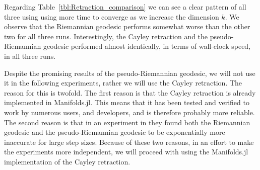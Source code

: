 Regarding Table~\ref{tbl:Retraction_comparison} we can see a clear pattern of all three using using more time to converge as we increase the dimension $k$. We observe that the Riemannian geodesic performs somewhat worse than the other two for all three runs. Interestingly, the Cayley retraction and the pseudo-Riemannian geodesic performed almost identically, in terms of wall-clock speed, in all three runs. 

Despite the promising results of the pseudo-Riemannian geodesic, we will not use it in the following experiments, rather we will use the Cayley retraction. The reason for this is twofold. The first reason is that the Cayley retraction is already implemented in Manifolds.jl. This means that it has been tested and verified to work by numerous users, and developers, and is therefore probably more reliable. The second reason is that in an experiment in \cite[p.~26]{BendokatZimmermann2021} they found both the Riemannian geodesic and the pseudo-Riemannian geodesic to be exponentially more inaccurate for large step sizes. Because of these two reasons, in an effort to make the experiments more independent, we will proceed with using the Manifolds.jl implementation of the Cayley retraction.